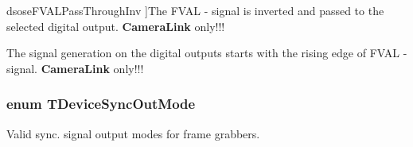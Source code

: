 \begin{Desc}
\begin{description}
{\hypertarget{group___device_specific_interface_gga83333b94d7a6a3f1ba96189b4e71fac0a086a44e2e3d26efcfca20a79ca4dbd3b}{dsose\+F\+V\+A\+L\+Pass\+Through\+Inv}\label{group___device_specific_interface_gga83333b94d7a6a3f1ba96189b4e71fac0a086a44e2e3d26efcfca20a79ca4dbd3b}
}]The F\+V\+A\+L -\/ signal is inverted and passed to the selected digital output. {\bfseries Camera\+Link\textregistered{}} only!!! \item[{\em 
\hypertarget{group___device_specific_interface_gga83333b94d7a6a3f1ba96189b4e71fac0acaa8af1baf65cbc500f2d5f886781a0e}{dsose\+F\+V\+A\+L\+Rising\+Edge}\label{group___device_specific_interface_gga83333b94d7a6a3f1ba96189b4e71fac0acaa8af1baf65cbc500f2d5f886781a0e}
}]The signal generation on the digital outputs starts with the rising edge of F\+V\+A\+L -\/ signal. {\bfseries Camera\+Link\textregistered{}} only!!! \end{description}
\end{Desc}
\hypertarget{group___device_specific_interface_gad576d8b9fd814fca5847184679d793b7}{
\subsubsection[{T\+Device\+Sync\+Out\+Mode}]{\setlength{\rightskip}{0pt plus 5cm}enum {\bf T\+Device\+Sync\+Out\+Mode}}}\label{group___device_specific_interface_gad576d8b9fd814fca5847184679d793b7}


Valid sync. signal output modes for frame grabbers. 

